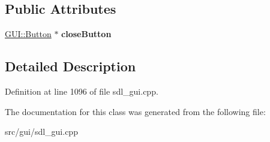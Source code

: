\subsection*{Public Attributes}
\begin{DoxyCompactItemize}
\item 
\hypertarget{classConfigurationWindow_a95eb72938fb54063c6c5094f47901c1d}{\hyperlink{classGUI_1_1Button}{G\-U\-I\-::\-Button} $\ast$ {\bfseries close\-Button}}\label{classConfigurationWindow_a95eb72938fb54063c6c5094f47901c1d}

\end{DoxyCompactItemize}


\subsection{Detailed Description}


Definition at line 1096 of file sdl\-\_\-gui.\-cpp.



The documentation for this class was generated from the following file\-:\begin{DoxyCompactItemize}
\item 
src/gui/sdl\-\_\-gui.\-cpp\end{DoxyCompactItemize}
